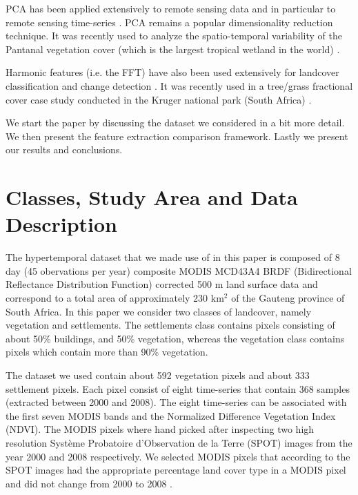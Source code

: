 \documentclass{article}
\begin{document}
PCA has been applied extensively to remote sensing data \cite{byrne1980,crist1984} and in particular to remote sensing time-series \cite{eastman1993,hall2003}. PCA remains a popular dimensionality reduction technique. It was recently used to analyze the spatio-temporal variability of 
the Pantanal vegetation cover (which is the largest tropical wetland in the world) \cite{almeida2015}.  %

Harmonic features (i.e. the FFT) have also been used extensively for landcover classification and change detection \cite{jakubauskas2002}. It was recently used in a tree/grass fractional cover case study conducted in 
the Kruger national park (South Africa) \cite{ibrahim2018}.

We start the paper by discussing the dataset we considered in a bit more detail. We then present the feature extraction comparison framework. Lastly we present our results and conclusions.

\section{Classes, Study Area and Data Description}
The hypertemporal dataset that we made use of in this paper is composed of 8 day (45 obervations per year) composite MODIS MCD43A4 BRDF (Bidirectional Reflectance Distribution Function) corrected 500 m land surface
data and correspond to a total area of approximately 230 km$^2$  of the Gauteng province of South Africa. 
In this paper we consider two classes of landcover, namely vegetation and settlements. The settlements class contains pixels consisting of about
50\% buildings, and 50\% vegetation, whereas the vegetation class contains pixels which contain more than 90\% vegetation. 

The dataset we used contain about 592 vegetation pixels and about 333 settlement pixels. Each pixel consist of eight time-series that contain 368 samples (extracted between 2000 and 2008). The eight time-series can be associated with the first seven MODIS bands and the Normalized Difference Vegetation Index (NDVI).
The MODIS pixels where hand picked after inspecting two high resolution Système Probatoire d’Observation de la Terre (SPOT) images from the year 2000 and 2008 respectively. 
We selected MODIS pixels that according to the SPOT images had the appropriate percentage land cover type in a MODIS pixel and did not change from 2000 to 2008 \cite{ackermann2011}.
\end{document}
